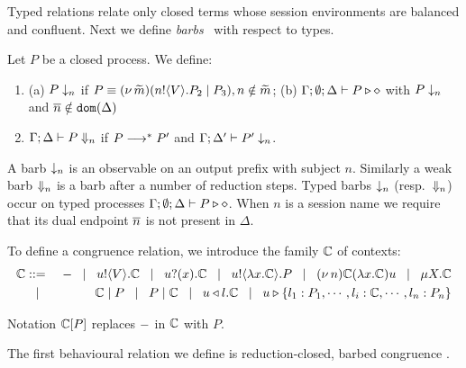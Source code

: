 \smallskip 

\noi Typed relations relate only closed terms whose
session environments %
are balanced  and confluent.
Next we define  {\em barbs}~\cite{MiSa92}
with respect to types. 

\smallskip 

\begin{definition}[Barbs]\rm
Let $P$ be a closed process. We define:
\begin{enumerate}
		\item	(a) $P \downarrow_{n}$ if $P \equiv (\nu\, \widetilde{m})(n ! \langle V \rangle . P_2 \;|\; P_3), n \notin \widetilde{m}$; %
(b)			$\Gamma; \emptyset; \Delta \vdash P \triangleright \diamond$ with $P \downarrow_{n}$ and $\overline{n} \notin \mathtt{dom}(\Delta)$
\item  
	$\Gamma; \Delta \vdash P \Downarrow_{n}$ if $P \longrightarrow^* P'$ and
			$\Gamma; \Delta' \vdash P' \downarrow_{n}$.			
	\end{enumerate}
\end{definition}

\smallskip 

\noi A barb $\downarrow_{n}$ is an observable on an output prefix with subject $n$.
Similarly a weak barb $\Downarrow_{n}$ is a barb after a number of reduction steps.
Typed barbs $\downarrow_{n}$ (resp.\ $\Downarrow_{n}$)
occur on typed processes $\Gamma; \emptyset; \Delta \vdash P \triangleright \diamond$.
When $n$ is a session name we require that its dual endpoint $\overline{n}$ is not present
in %
$\Delta$.

To define a congruence relation, we introduce the family ${\Bbb C}$ of contexts:
\begin{eqnarray*}
	{\Bbb C} & ::= & - \;\;\;|\;\;\; u ! \langle V \rangle . {\Bbb C} \;\;\;|\;\;\; u ? (x) . {\Bbb C} \;\;\;|\;\;\; u ! \langle \lambda x.{\Bbb C} \rangle . P \;\;\;|\;\;\; (\nu\, n) {\Bbb C}
	(\lambda x.{\Bbb C})u \;\;\;|\;\;\; \mu X. {\Bbb C}\\ 
	& \;\;\;|\;\;\; & {\Bbb C} \;|\; P \;\;\;|\;\;\; P \;|\; {\Bbb C} \;\;\;|\;\;\; u \triangleleft l . {\Bbb C} \;\;\;|\;\;\; u \triangleright \{l_1:P_1,\cdots,l_i:{\Bbb C},\cdots,l_n:P_n\}
\end{eqnarray*}

Notation ${\Bbb C}[P]$ replaces 
$-$ in ${\Bbb C}$ with $P$.

\smallskip 

\noi The first behavioural relation we define is reduction-closed, barbed congruence \cite{HondaKYoshida95}. 

\smallskip 

